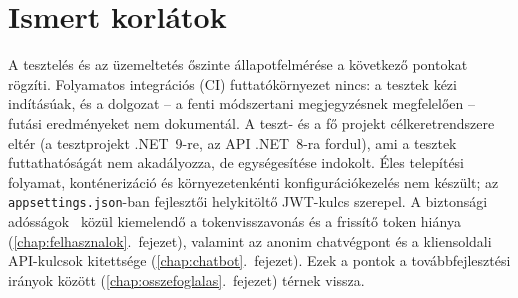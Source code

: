 \section{Ismert korlátok}
\label{sec:teszt-korlatok}

A tesztelés és az üzemeltetés őszinte állapotfelmérése a következő pontokat rögzíti.
Folyamatos integrációs (CI) futtatókörnyezet nincs: a tesztek kézi indításúak, és a dolgozat --
a fenti módszertani megjegyzésnek megfelelően -- futási eredményeket nem dokumentál.
A teszt- és a fő projekt célkeretrendszere eltér (a tesztprojekt .NET~9-re, az API .NET~8-ra
fordul), ami a tesztek futtathatóságát nem akadályozza, de egységesítése indokolt. Éles
telepítési folyamat, konténerizáció és környezetenkénti konfigurációkezelés nem készült; az
\texttt{appsettings.json}-ban fejlesztői helykitöltő JWT-kulcs szerepel. A biztonsági
adósságok~\cite{owasp2021} közül kiemelendő a tokenvisszavonás és a frissítő token hiánya
(\ref{chap:felhasznalok}.~fejezet), valamint az anonim chatvégpont és a kliensoldali
API-kulcsok kitettsége (\ref{chap:chatbot}.~fejezet). Ezek a pontok a továbbfejlesztési
irányok között (\ref{chap:osszefoglalas}.~fejezet) térnek vissza.
